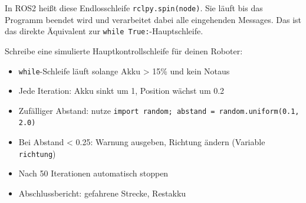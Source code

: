 \begin{ros}
In ROS2 heißt diese Endlosschleife \texttt{rclpy.spin(node)}. Sie läuft bis das Programm beendet wird und verarbeitet dabei alle eingehenden Messages. Das ist das direkte Äquivalent zur \texttt{while True:}-Hauptschleife.
\end{ros}

\begin{uebung}[title=Projektaufgabe Modul 3: Simulated Drive Loop]
Schreibe eine simulierte Hauptkontrollschleife für deinen Roboter:
\begin{itemize}
    \item \texttt{while}-Schleife läuft solange Akku > 15\% und kein Notaus
    \item Jede Iteration: Akku sinkt um 1, Position wächst um 0.2
    \item Zufälliger Abstand: nutze \texttt{import random; abstand = random.uniform(0.1, 2.0)}
    \item Bei Abstand < 0.25: Warnung ausgeben, Richtung ändern (Variable \texttt{richtung})
    \item Nach 50 Iterationen automatisch stoppen
    \item Abschlussbericht: gefahrene Strecke, Restakku
\end{itemize}
\end{uebung}
